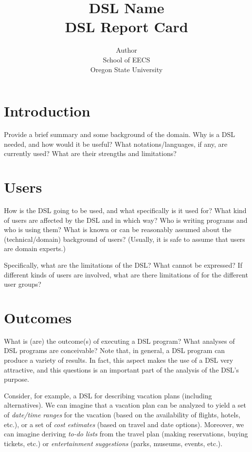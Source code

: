 \documentclass[11pt]{article}
\begin{document}
\title{\textbf{DSL Name}
\\ DSL Report Card}

\author{Author \\
School of EECS \\ 
Oregon State University
}

\maketitle


\section{Introduction}
\label{sec:intro}

Provide a brief summary and some background of the domain. Why is a DSL
needed, and how would it be useful?  What notations/languages, if any, are
currently used? What are their strengths and limitations?


\section{Users}
\label{sec:users}

How is the DSL going to be used, and what specifically is it used for?  
% 
What kind of users are affected by the DSL and in which way? Who is writing
programs and who is using them? What is known or can be reasonably assumed
about the (technical/domain) background of users? (Usually, it is safe to
assume that users are domain experts.)

Specifically, what are the limitations of the DSL? What cannot be expressed?
If different kinds of users are involved, what are there limitations of for
the different user groups?



\section{Outcomes}
\label{sec:outcomes}

What is (are) the outcome(s) of executing a DSL program? What analyses of DSL
programs are conceivable?  Note that, in general, a DSL program can produce a
variety of results. In fact, this aspect makes the use of a DSL very attractive, and this
questions is an important part of the analysis of the DSL's purpose.

Consider, for example, a DSL for describing vacation plans (including
alternatives).  We can imagine that a vacation plan can be analyzed to yield a
set of \emph{date/time ranges} for the vacation (based on the availability of
flights, hotels, etc.), or a set of \emph{cost estimates} (based on travel and
date options). Moreover, we can imagine deriving \emph{to-do lists} from the
travel plan (making reservations, buying tickets, etc.) or \emph{entertainment
suggestions} (parks, museums, events, etc.). 
\end{document}
